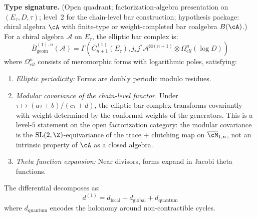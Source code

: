\begin{theorem}\label{thm:elliptic-bar}
\textbf{Type signature.} (Open quadrant; factorization-algebra
presentation on $(E_\tau, D, \tau)$; level~$2$ for the chain-level bar
construction; hypothesis package: chiral algebra $\cA$ with
finite-type or weight-completed bar coalgebra $B(\cA)$.)
For a chiral algebra $\mathcal{A}$ on $E_\tau$, the elliptic bar complex is:
\[\bar{B}^{(1),n}_{\text{geom}}(\mathcal{A}) = \Gamma\left(\overline{C}_{n+1}^{(1)}(E_\tau), j_*j^*\mathcal{A}^{\boxtimes(n+1)} \otimes \Omega^n_{ell}(\log D)\right)\]
where $\Omega^n_{ell}$ consists of meromorphic forms with logarithmic poles, satisfying:
\begin{enumerate}
\item \emph{Elliptic periodicity:} Forms are doubly periodic modulo residues.
\item \emph{Modular covariance of the chain-level functor.} Under
$\tau \mapsto (a\tau+b)/(c\tau+d)$, the elliptic bar complex transforms
covariantly with weight determined by the conformal weights of the
generators. This is a level-$5$ statement on the open factorization
category: the modular covariance is the $\mathrm{SL}(2,\Z)$-equivariance
of the trace + clutching map on $\overline{\cM}_{1,n}$, not an intrinsic
property of $\cA$ as a closed algebra.
\item \emph{Theta function expansion:} Near divisors, forms expand in
Jacobi theta functions.
\end{enumerate}

The differential decomposes as:
\[d^{(1)} = d_{\text{local}} + d_{\text{global}} + d_{\text{quantum}}\]
where $d_{\text{quantum}}$ encodes the holonomy around non-contractible cycles.
\end{theorem}

